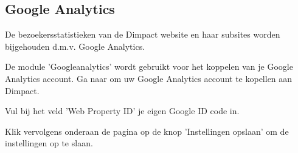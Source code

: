 \subsection{Google Analytics}\label{googleanalytics}
De bezoekersstatistieken van de Dimpact website en haar subsites worden bijgehouden d.m.v. Google Analytics.

De module 'Googleanalytics'  wordt gebruikt voor het koppelen van je Google Analytics account. Ga naar  om uw Google Analytics account te kopellen aan Dimpact. 

Vul bij het veld 'Web Property ID' je eigen Google ID code in. 

Klik vervolgens onderaan de pagina op de knop 'Instellingen opslaan' om de instellingen op te slaan.